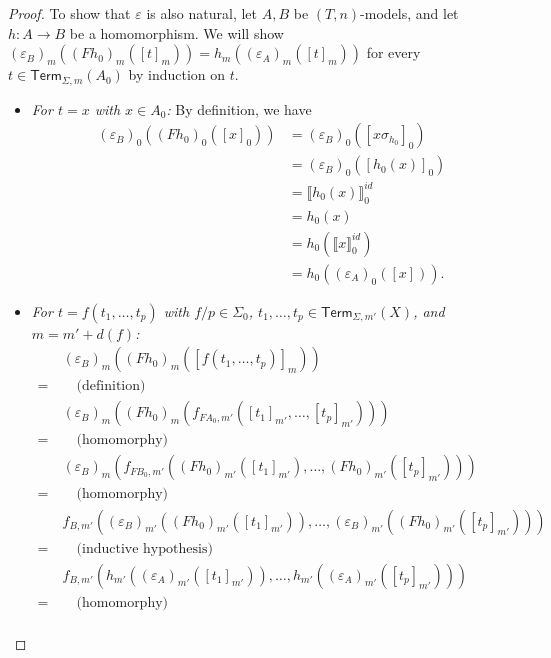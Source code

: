 \documentclass[11pt,a4paper]{amsart}
\newcommand{\Term}{\mathsf{Term}}
\newcommand{\sig}{\Sigma}
\newcommand{\sigp}{\Sigma_0}
\theoremstyle{plain}
\newcommand{\id}{\mathit{id}}
\numberwithin{equation}{section}
\newcommand{\+}[1]{\mathcal{#1}\xspace}
\theoremstyle{definition}
\begin{document}
\begin{proof}
    To show that \(\varepsilon\) is also natural, let \(A, B\) be
    $(T,n)$-models, and let \(h\colon A\to B\) be a homomorphism.  We
    will show
    \((\varepsilon_B)_m((Fh_0)_m([t]_m)) =
    h_m((\varepsilon_A)_m([t]_m))\) for every
    \(t \in \Term_{\sig, m}(A_0)\) by induction on \(t\).
    \begin{itemize}
        \item
            \textit{For \(t = x\) with \(x \in A_0\):} By definition, we have
            \begin{align*}
                (\varepsilon_B)_0((Fh_0)_0([x]_0))
                &= (\varepsilon_B)_0([x\sigma_{h_0}]_0) \\
                &= (\varepsilon_B)_0([h_0(x)]_0) \\
                &= \llbracket h_0(x) \rrbracket^{\id}_0 \\
                &= h_0(x) \\
                &= h_0(\llbracket x \rrbracket^{\id}_0) \\
                &= h_0((\varepsilon_A)_0([x])).
            \end{align*}
        \item
            \textit{For \(t = f(t_1, \ldots, t_p)\) with \(f/p \in \sigp\), \(t_1, \ldots, t_p \in \Term_{\sig, m'}(X)\), and \(m = m' + d(f)\):}
            \begin{align*}
                &(\varepsilon_B)_m((Fh_0)_m([f(t_1, \ldots, t_p)]_m)) \\
                =~&\quad\text{(definition)} \\
                &(\varepsilon_B)_m((Fh_0)_m(f_{FA_0, m'}([t_1]_{m'}, \ldots, [t_p]_{m'}))) \\
                =~&\quad\text{(homomorphy)} \\
                &(\varepsilon_B)_m(f_{FB_0, m'}((Fh_0)_{m'}([t_1]_{m'}), \ldots, (Fh_0)_{m'}([t_p]_{m'}))) \\
                =~&\quad\text{(homomorphy)} \\
                &f_{B, m'}((\varepsilon_B)_{m'}((Fh_0)_{m'}([t_1]_{m'})), \ldots, (\varepsilon_B)_{m'}((Fh_0)_{m'}([t_p]_{m'}))) \\
                =~&\quad\text{(inductive hypothesis)} \\
                &f_{B, m'}(h_{m'}((\varepsilon_A)_{m'}([t_1]_{m'})), \ldots, h_{m'}((\varepsilon_A)_{m'}([t_p]_{m'}))) \\
                =~&\quad\text{(homomorphy)} \\

\end{align*}
\end{itemize}
\end{proof}
\end{document}
